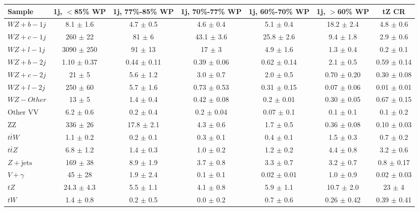 \begin{tabular}{|l|c|c|c|c|c|c|}
\hline 
Sample & {1j, $<$85\% WP} & {1j, 77\%-85\% WP} & {1j, 70\%-77\% WP} & {1j, 60\%-70\% WP} & {1j, $>$60\% WP} & {tZ CR}\\
\hline 
  $WZ + b - 1j$   & 8.1 $\pm$ 1.6 & 4.7 $\pm$ 0.5 & 4.6 $\pm$ 0.4 & 5.1 $\pm$ 0.4 & 18.2 $\pm$ 2.4 & 4.8 $\pm$ 0.6 \\ 
  $WZ + c - 1j$   & 260 $\pm$ 22 & 81 $\pm$ 6 & 43.1 $\pm$ 3.6 & 25.8 $\pm$ 2.6 & 9.4 $\pm$ 1.8 & 2.9 $\pm$ 0.6 \\ 
  $WZ + l - 1j$   & 3090 $\pm$ 250 & 91 $\pm$ 13 & 17 $\pm$ 3 & 4.9 $\pm$ 1.6 & 1.3 $\pm$ 0.4 & 0.2 $\pm$ 0.1 \\ 
  $WZ + b - 2j$   & 1.10 $\pm$ 0.37 & 0.44 $\pm$ 0.11 & 0.39 $\pm$ 0.06 & 0.62 $\pm$ 0.14 & 2.1 $\pm$ 0.5 & 0.59 $\pm$ 0.14 \\
  $WZ + c - 2j$   & 21 $\pm$ 5 & 5.6 $\pm$ 1.2 & 3.0 $\pm$ 0.7 & 2.0 $\pm$ 0.5 & 0.70 $\pm$ 0.20 & 0.30 $\pm$ 0.08\\
  $WZ + l - 2j$   & 250 $\pm$ 60 & 5.7 $\pm$ 1.6 & 0.73 $\pm$ 0.53 & 0.31 $\pm$ 0.15 & 0.07 $\pm$ 0.06 & 0.01 $\pm$ 0.01 \\
  $WZ - Other$   & 13 $\pm$ 5 & 1.4 $\pm$ 0.4 & 0.42 $\pm$ 0.08 & 0.2 $\pm$ 0.01 & 0.30 $\pm$ 0.05 & 0.67 $\pm$ 0.15 \\
  Other VV   & 6.2 $\pm$ 0.6 & 0.2 $\pm$ 0.4 & 0.2 $\pm$ 0.04 & 0.07 $\pm$ 0.1 & 0.1 $\pm$ 0.1 & 0.1 $\pm$ 0.2 \\ 
  ZZ   & 336 $\pm$ 26 & 17.8 $\pm$ 2.1 & 4.3 $\pm$ 0.6 & 1.7 $\pm$ 0.5 & 0.36 $\pm$ 0.08 & 0.10 $\pm$ 0.03 \\ 
  $t\bar{t}W$   & 1.1 $\pm$ 0.2 & 0.2 $\pm$ 0.1 & 0.3 $\pm$ 0.1 & 0.4 $\pm$ 0.1 & 1.5 $\pm$ 0.3 & 0.7 $\pm$ 0.2 \\ 
  $t\bar{t}Z$   & 6.8 $\pm$ 1.2 & 1.4 $\pm$ 0.3 & 1.0 $\pm$ 0.2 & 1.2 $\pm$ 0.2 & 4.4 $\pm$ 0.8 & 3.2 $\pm$ 0.6 \\ 
  $Z+\text{jets}$   & 169 $\pm$ 38 & 8.9 $\pm$ 1.9 & 3.7 $\pm$ 0.8 & 3.3 $\pm$ 0.7 & 3.2 $\pm$ 0.7 & 0.8 $\pm$ 0.17 \\ 
  $V+\gamma$   & 45 $\pm$ 28 & 1.9 $\pm$ 2.4 & 0.1 $\pm$ 0.1 & 0.02 $\pm$ 0.01 & 1.0 $\pm$ 0.9 & 0.02 $\pm$ 0.03 \\ 
  $tZ$   & 24.3 $\pm$ 4.3 & 5.5 $\pm$ 1.1 & 4.1 $\pm$ 0.8 & 5.9 $\pm$ 1.1 & 10.7 $\pm$ 2.0 & 23 $\pm$ 4 \\ 
  $tW$   & 1.4 $\pm$ 0.8 & 0.2 $\pm$ 0.5 & 0.0 $\pm$ 0.2 & 0.7 $\pm$ 0.6 & 0.26 $\pm$ 0.42 & 0.39 $\pm$ 0.41 \\ 

\end{tabular}
